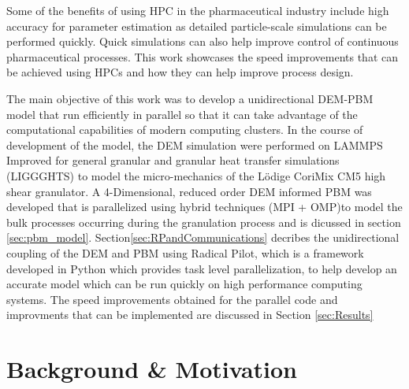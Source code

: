\documentclass[preprint,11pt,authoryear]{elsarticle}
\begin{document}


Some of the benefits of using
HPC in the pharmaceutical industry include high accuracy for parameter estimation as detailed 
particle-scale simulations can be performed quickly. Quick simulations can also help 
improve control of continuous pharmaceutical processes. This work showcases the speed improvements 
that can be achieved using HPCs and how they can help improve process design.

The main objective of this work was to develop a unidirectional DEM-PBM model that run efficiently in 
parallel so that it can take advantage of the computational capabilities of  modern computing 
clusters. In the course of development of the model, the DEM simulation were performed on 
LAMMPS Improved for general granular and granular heat transfer simulations (LIGGGHTS) \citep{Kloss2012} to  
model the micro-mechanics of the L\"{o}dige CoriMix CM5 high shear granulator. A 4-Dimensional, 
reduced order DEM informed PBM was developed that is parallelized using hybrid techniques 
(MPI + OMP)to model the bulk processes occurring during the granulation process and 
is dicussed in section \ref{sec:pbm_model}. Section\ref{sec:RPandCommunications} decribes 
the unidirectional coupling of the DEM and PBM using Radical Pilot, which is a 
framework developed in Python which provides task level parallelization, to help develop 
an accurate model which can be run quickly on high performance computing systems. The speed
improvements obtained for the parallel code and improvments that can be implemented are discussed
in Section \ref{sec:Results}


\section{Background \& Motivation}
\end{document}
